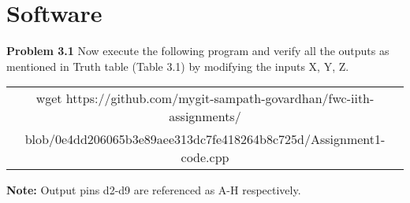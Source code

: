 \documentclass[journal,12pt,twocolumn]{IEEEtran}
\begin{document}
\section{Software}

\textbf{Problem 3.1} Now execute the following program and verify all the outputs as mentioned in Truth table (Table 3.1) by modifying the inputs X, Y, Z.\\
\begin{table}[]
    \centering
    \begin{tabular}{| c |}
    \hline
    wget https://github.com/mygit-sampath-govardhan/fwc-iith-assignments/\\blob/0e4dd206065b3e89aee313dc7fe418264b8c725d/Assignment1-code.cpp\\
    \hline
    \end{tabular}
\end{table}

\textbf{Note:} Output pins d2-d9 are referenced as A-H respectively.\\
\end{document}
